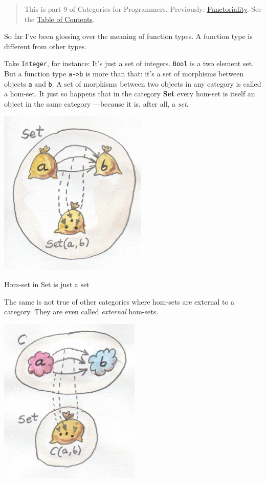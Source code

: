 \begin{quote}
This is part 9 of Categories for Programmers. Previously:
\href{https://bartoszmilewski.com/2015/02/03/functoriality/}{Functoriality}.
See the
\href{https://bartoszmilewski.com/2014/10/28/category-theory-for-programmers-the-preface/}{Table
of Contents}.
\end{quote}

So far I've been glossing over the meaning of function types. A function
type is different from other types.

Take \texttt{Integer}, for instance: It's just a set of integers.
\texttt{Bool} is a two element set. But a function type
\texttt{a-\textgreater{}b} is more than that: it's a set of morphisms
between objects \texttt{a} and \texttt{b}. A set of morphisms between
two objects in any category is called a hom-set. It just so happens that
in the category \textbf{Set} every hom-set is itself an object in the
same category ---because it is, after all, a \emph{set}.

\hypertarget{attachment_4241}{}
\includegraphics[width=2.79167in]{images/set-hom-set.jpg}

Hom-set in Set is just a set

The same is not true of other categories where hom-sets are external to
a category. They are even called \emph{external} hom-sets.

\hypertarget{attachment_4242}{}
\includegraphics[width=2.65625in]{images/hom-set.jpg}

